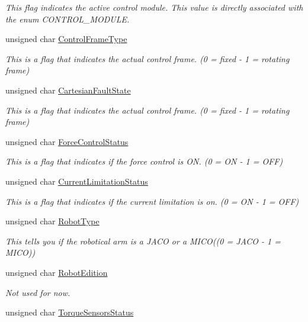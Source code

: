 \begin{DoxyCompactItemize}
\begin{DoxyCompactList}\small\item\em This flag indicates the active control module. This value is directly associated with the enum C\+O\+N\+T\+R\+O\+L\+\_\+\+M\+O\+D\+U\+LE. \end{DoxyCompactList}\item 
unsigned char \hyperlink{struct_quick_status_a2a5b8e7585c34a53436e8bcc1650ea18}{Control\+Frame\+Type}
\begin{DoxyCompactList}\small\item\em This is a flag that indicates the actual control frame. (0 = fixed -\/ 1 = rotating frame) \end{DoxyCompactList}\item 
unsigned char \hyperlink{struct_quick_status_a738566489a176b3dbe45c5628239c6d1}{Cartesian\+Fault\+State}
\begin{DoxyCompactList}\small\item\em This is a flag that indicates the actual control frame. (0 = fixed -\/ 1 = rotating frame) \end{DoxyCompactList}\item 
unsigned char \hyperlink{struct_quick_status_a68fa24e235f5b81c7231abf1e121be50}{Force\+Control\+Status}
\begin{DoxyCompactList}\small\item\em This is a flag that indicates if the force control is ON. (0 = ON -\/ 1 = O\+FF) \end{DoxyCompactList}\item 
unsigned char \hyperlink{struct_quick_status_a8177e27c2aeab753c3fa87fd2c7342c3}{Current\+Limitation\+Status}
\begin{DoxyCompactList}\small\item\em This is a flag that indicates if the current limitation is on. (0 = ON -\/ 1 = O\+FF) \end{DoxyCompactList}\item 
unsigned char \hyperlink{struct_quick_status_a74b2c900b935a07df18fbea12c3f4d68}{Robot\+Type}
\begin{DoxyCompactList}\small\item\em This tells you if the robotical arm is a J\+A\+CO or a M\+I\+CO((0 = J\+A\+CO -\/ 1 = M\+I\+CO)) \end{DoxyCompactList}\item 
unsigned char \hyperlink{struct_quick_status_a966ce09dd5f19aaeea7edf9aff76d6d8}{Robot\+Edition}
\begin{DoxyCompactList}\small\item\em Not used for now. \end{DoxyCompactList}\item 
unsigned char \hyperlink{struct_quick_status_a7281937d476103ff28398205848897f1}{Torque\+Sensors\+Status}
\end{DoxyCompactItemize}


